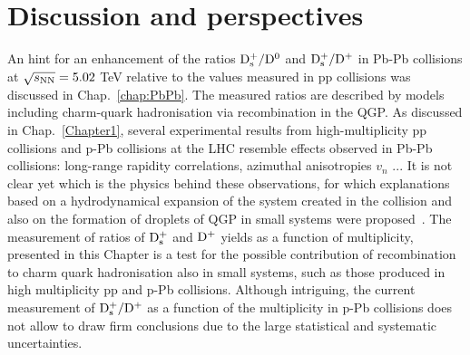 \section{Discussion and perspectives}
\label{sec:discussionpPb}
An hint for an enhancement of the ratios ${\rm D_s^+}/{\rm D^0}$ and ${\rm D_s^+}/{\rm D^+}$ in Pb-Pb collisions at $\sqrt{s_{\rm NN}}=5.02$ TeV
relative to the values measured in pp collisions was discussed in Chap.~\ref{chap:PbPb}. 
The measured ratios are described by models including
charm-quark hadronisation via recombination in the QGP. 
As discussed in Chap.~\ref{Chapter1}, several experimental results from high-multiplicity pp collisions and 
p-Pb collisions at the LHC resemble effects observed in Pb-Pb collisions: long-range rapidity correlations, azimuthal anisotropies $v_n$ ... 
It is not clear yet which is the physics behind these observations, for which 
explanations based on a hydrodynamical expansion of the system created in the collision and also on 
the formation of droplets of QGP in small systems were proposed~\cite{Gyulassy:2004zy,Xu:2004mz,Lin:2004en,Dusling:2015rja,Schenke:2016lrs}. 
The measurement of ratios of ${\rm D_s^+}$ and ${\rm D^+}$ yields as a function of multiplicity, presented in this Chapter
is a test for the possible contribution of recombination to charm quark hadronisation also 
in small systems, such as those produced in high multiplicity pp and p-Pb collisions.
Although intriguing, the current measurement of ${\rm D_s^+}/{\rm D^+}$ as a function of the multiplicity in p-Pb collisions does
not allow to draw firm conclusions due to the large statistical and systematic uncertainties.\\




